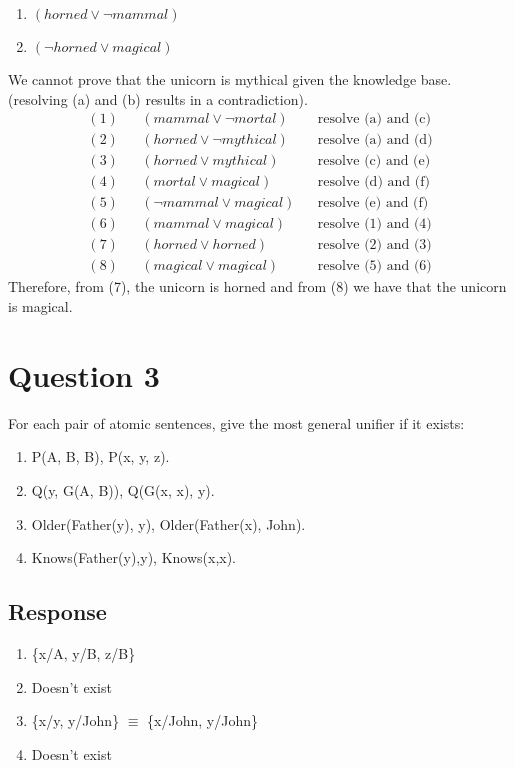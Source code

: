 \documentclass[13pt]{article}
\begin{document}
\begin{enumerate}[label=(\alph*)]
\begin{enumerate}
  \item $(horned \lor \neg mammal)$
  \item $(\neg horned \lor magical)$
  \end{enumerate}
  We cannot prove that the unicorn is mythical given the knowledge base. (resolving (a) and (b) results in a contradiction).
  \begin{align*}
    (1) && (mammal \lor \neg mortal) && \text{resolve (a) and (c)} \\
    (2) && (horned \lor \neg mythical) && \text{resolve (a) and (d)} \\
    (3) && (horned \lor mythical) && \text{resolve (c) and (e)} \\
    (4) && (mortal \lor magical) && \text{resolve (d) and (f)} \\
    (5) && (\neg mammal \lor magical) && \text{resolve (e) and (f)} \\
    (6) && (mammal \lor magical) && \text{resolve (1) and (4)} \\
    (7) && (horned \lor horned) && \text{resolve (2) and (3)} \\
    (8) && (magical \lor magical) && \text{resolve (5) and (6)}
  \end{align*}
  Therefore, from (7), the unicorn is horned and from (8) we have that the unicorn is magical.
\end{enumerate}

\newpage
\section*{Question 3} For each pair of atomic sentences, give the most general unifier if it exists:
\begin{enumerate}[label=(\alph*)]
\item P(A, B, B), P(x, y, z).
\item Q(y, G(A, B)), Q(G(x, x), y).
\item Older(Father(y), y), Older(Father(x), John).
\item Knows(Father(y),y), Knows(x,x).
\end{enumerate}

\subsection*{Response}
\begin{enumerate}[label=(\alph*)]
\item \{x/A, y/B, z/B\}
\item Doesn't exist
\item \{x/y, y/John\} $\equiv$ \{x/John, y/John\}
\item Doesn't exist
\end{enumerate}
\end{document}
